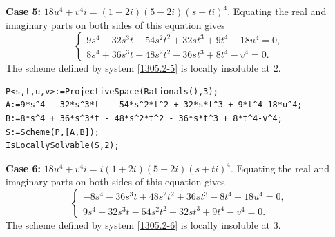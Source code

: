 \documentclass[a4paper,12pt,english,reqno]{amsart}
\begin{document}
{\bf Case 5:} $18u^4+v^4i=(1+2i)(5-2i)(s+ti)^4$. Equating the real and imaginary parts on both sides of this equation gives
\begin{equation}\label{1305.2-5}
\begin{cases}
9s^4 - 32s^3t - 54s^2t^2 + 32st^3 + 9t^4 - 18u^4=0,\\
8s^4 + 36s^3t - 48s^2t^2 - 36st^3 + 8t^4 - v^4=0.
\end{cases}
\end{equation}
The scheme defined by system \eqref{1305.2-5} is locally insoluble at $2$.

\begin{lstlisting}
P<s,t,u,v>:=ProjectiveSpace(Rationals(),3);
A:=9*s^4 - 32*s^3*t -  54*s^2*t^2 + 32*s*t^3 + 9*t^4-18*u^4;
B:=8*s^4 + 36*s^3*t - 48*s^2*t^2 - 36*s*t^3 + 8*t^4-v^4;
S:=Scheme(P,[A,B]);
IsLocallySolvable(S,2);
\end{lstlisting}
{\bf Case 6:} $18u^4+v^4i=i(1+2i)(5-2i)(s+ti)^4$. Equating the real and imaginary parts on both sides of this equation gives
\begin{equation}\label{1305.2-6}
\begin{cases}
-8s^4 - 36s^3t + 48s^2t^2 + 36st^3 - 8t^4 - 18u^4=0,\\
9s^4 - 32s^3t - 54s^2t^2 + 32st^3 + 9t^4 - v^4=0.
\end{cases}
\end{equation}
The scheme defined by system \eqref{1305.2-6} is locally insoluble at $3$.
\end{document}
